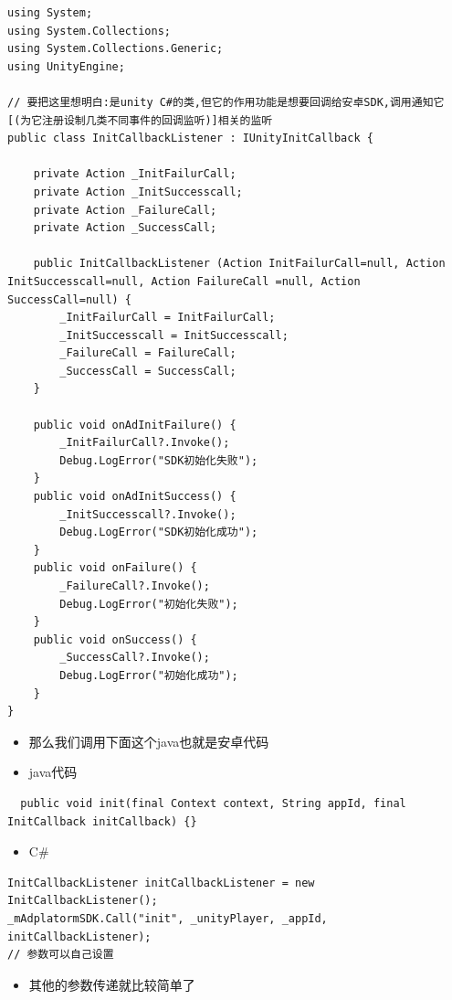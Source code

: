 \documentclass[9pt, b5paper]{article}
\begin{document}
\begin{verbatim}
using System;
using System.Collections;
using System.Collections.Generic;
using UnityEngine;

// 要把这里想明白:是unity C#的类,但它的作用功能是想要回调给安卓SDK,调用通知它[(为它注册设制几类不同事件的回调监听)]相关的监听
public class InitCallbackListener : IUnityInitCallback {

    private Action _InitFailurCall;
    private Action _InitSuccesscall;
    private Action _FailureCall;
    private Action _SuccessCall;

    public InitCallbackListener (Action InitFailurCall=null, Action InitSuccesscall=null, Action FailureCall =null, Action SuccessCall=null) {
        _InitFailurCall = InitFailurCall;
        _InitSuccesscall = InitSuccesscall;
        _FailureCall = FailureCall;
        _SuccessCall = SuccessCall;
    }

    public void onAdInitFailure() {
        _InitFailurCall?.Invoke();
        Debug.LogError("SDK初始化失败");
    }
    public void onAdInitSuccess() {
        _InitSuccesscall?.Invoke();
        Debug.LogError("SDK初始化成功");
    }
    public void onFailure() {
        _FailureCall?.Invoke();
        Debug.LogError("初始化失败");
    }
    public void onSuccess() {
        _SuccessCall?.Invoke();
        Debug.LogError("初始化成功");
    }
}
\end{verbatim}
\begin{itemize}
\item 那么我们调用下面这个java也就是安卓代码
\item java代码
\end{itemize}
\begin{verbatim}
  public void init(final Context context, String appId, final InitCallback initCallback) {}
\end{verbatim}
\begin{itemize}
\item C\#
\end{itemize}
\begin{verbatim}
InitCallbackListener initCallbackListener = new InitCallbackListener();
_mAdplatormSDK.Call("init", _unityPlayer, _appId, initCallbackListener);
// 参数可以自己设置
\end{verbatim}
\begin{itemize}
\item 其他的参数传递就比较简单了
\end{itemize}
\end{document}
